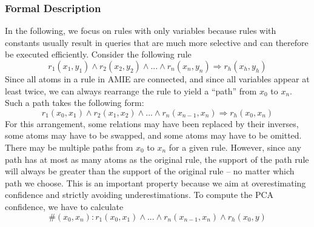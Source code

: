 {%
%




\subsubsection{Formal Description}

In the following, we focus on rules with only variables because rules with constants usually result in queries that are much more selective and can therefore be executed efficiently.
Consider the following rule
$$
  r_1(x_1,y_1) \wedge r_2(x_2,y_2) \wedge ... \wedge r_n(x_n,y_n) \Rightarrow r_h(x_h,y_h)
$$
Since all atoms in a rule in AMIE are connected, and since all variables appear at least twice, we can always rearrange the rule to yield a ``path'' from $x_0$ to $x_n$. Such a path takes the following form:
$$
  r_1(x_0,x_1) \wedge r_2(x_1,x_2) \wedge ... \wedge r_n(x_{n-1},x_n) \Rightarrow r_h(x_0,x_n)
$$
For this arrangement, some relations may have been replaced by their inverses, some atoms may have to be swapped, and some atoms may have to be omitted. 
There may be multiple paths from $x_0$ to $x_n$ for a given rule. 
However, since any path has at most as many atoms as the original rule, the support of the path rule will always be greater than the support of the original rule -- no matter which path we choose. 
This is an important property because we aim at overestimating confidence and strictly avoiding underestimations.
To compute the PCA confidence, we have to calculate
$$
 \#(x_0,x_n): r_1(x_0,x_1) \wedge ... \wedge r_n(x_{n-1},x_n) \wedge r_h(x_0,y)
$$
}
